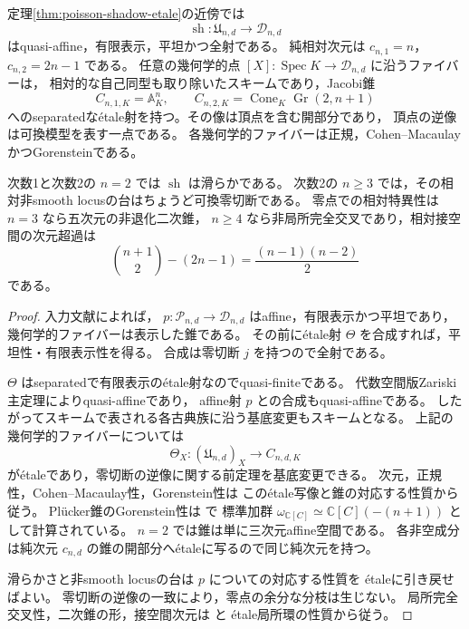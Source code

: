 \begin{corollary}[可換模型への平坦射と相対特異性]
\label{cor:shadow-flat-cone-fibers}
定理\ref{thm:poisson-shadow-etale}の近傍では
\[
 \operatorname{sh}:\mathfrak U_{n,d}\longrightarrow\mathcal D_{n,d}
\]
はquasi-affine，有限表示，平坦かつ全射である。
純相対次元は $c_{n,1}=n$，$c_{n,2}=2n-1$ である。
任意の幾何学的点 $[X]:\operatorname{Spec}K\to\mathcal D_{n,d}$ に沿うファイバーは，
相対的な自己同型も取り除いたスキームであり，Jacobi錐
\[
 C_{n,1,K}=\mathbb A_K^n,\qquad
 C_{n,2,K}=\operatorname{Cone}_K\operatorname{Gr}(2,n+1)
\]
へのseparatedな\'{e}tale射を持つ。その像は頂点を含む開部分であり，
頂点の逆像は可換模型を表す一点である。
各幾何学的ファイバーは正規，Cohen--MacaulayかつGorensteinである。

次数1と次数2の $n=2$ では $\operatorname{sh}$ は滑らかである。
次数2の $n\ge3$ では，その相対非smooth locusの台はちょうど可換零切断である。
零点での相対特異性は $n=3$ なら五次元の非退化二次錐，
$n\ge4$ なら非局所完全交叉であり，相対接空間の次元超過は
\[
 \binom{n+1}{2}-(2n-1)=\frac{(n-1)(n-2)}2
\]
である。
\end{corollary}
\begin{proof}
入力文献\cite[定理8.8]{PoissonDP}によれば，
$p:\mathcal P_{n,d}\to\mathcal D_{n,d}$ はaffine，有限表示かつ平坦であり，
幾何学的ファイバーは表示した錐である。
その前に\'{e}tale射 $\Theta$ を合成すれば，平坦性・有限表示性を得る。
合成は零切断 $j$ を持つので全射である。

$\Theta$ はseparatedで有限表示の\'{e}tale射なのでquasi-finiteである。
代数空間版Zariski主定理\cite[Tag 082J]{StacksProject}によりquasi-affineであり，
affine射 $p$ との合成もquasi-affineである。
したがってスキームで表される各古典族に沿う基底変更もスキームとなる。
上記の幾何学的ファイバーについては
\[
 \Theta_X:(\mathfrak U_{n,d})_X\longrightarrow C_{n,d,K}
\]
が\'{e}taleであり，零切断の逆像に関する前定理を基底変更できる。
次元，正規性，Cohen--Macaulay性，Gorenstein性は
この\'{e}tale写像と錐の対応する性質から従う。
Pl\"ucker錐のGorenstein性は
\cite[命題10.4，\texttt{prop:plucker-terminal}]{PoissonDP}で
標準加群 $\omega_{\mathbb C[C]}\simeq\mathbb C[C](-(n+1))$ として計算されている。
$n=2$ では錐は単に三次元affine空間である。
各非空成分は純次元 $c_{n,d}$ の錐の開部分へ\'{e}taleに写るので同じ純次元を持つ。

滑らかさと非smooth locusの台は $p$ についての対応する性質を
\'{e}taleに引き戻せばよい。
零切断の逆像の一致により，零点の余分な分枝は生じない。
局所完全交叉性，二次錐の形，接空間次元は
\cite[補題10.1，\texttt{lemma:cone-lci}]{PoissonDP}と
\'{e}tale局所環の性質から従う。
\end{proof}

